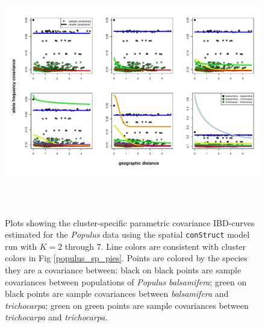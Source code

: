 \documentclass[12pt]{article}
\newcommand{\tri}{\textit{trichocarpa}}
\newcommand{\bals}{\textit{balsamifera}}
\begin{document}
\begin{figure}
	\centering
		{\includegraphics[width=6in,height=4in]{figs/populus/populus_sp_clst_covs.pdf}}
	\caption{
	Plots showing the cluster-specific parametric covariance IBD-curves 
	estimated for the \textit{Populus} data using 
	the spatial \texttt{conStruct} model run with $K=2$ through 7.
	Line colors are consistent with cluster colors in Fig \ref{populus_sp_pies}.
	Points are colored by the species they are a covariance between:
	black on black points are sample covariances between populations of \textit{Populus balsamifera};
	green on black points are sample covariances between \bals{} and \tri{};
	green on green points are sample covariances between \tri{} and \tri{}.
    }\label{populus_sp_clst_covs}
\end{figure}
\end{document}
